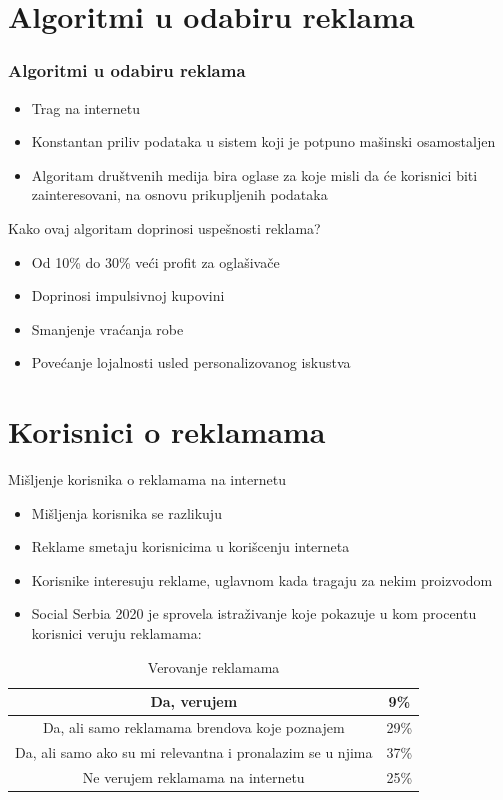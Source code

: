\documentclass{beamer}
\begin{document}
	\section{Algoritmi u odabiru reklama}
	\begin{frame}
		\frametitle{Algoritmi u odabiru reklama}
		\begin{itemize}
			\item Trag na internetu
			\item Konstantan priliv podataka u sistem koji je potpuno mašinski osamostaljen
			\item Algoritam društvenih medija bira oglase za koje misli da će korisnici biti zainteresovani, na osnovu prikupljenih podataka
		\end{itemize} 
	\end{frame}
	
	\begin{frame}{Kako ovaj algoritam doprinosi uspešnosti reklama?}
		\begin{itemize}
			\item Od 10\% do 30\% veći profit za oglašivače
			\item Doprinosi impulsivnoj kupovini
			\item Smanjenje vraćanja robe
			\item Povećanje lojalnosti usled personalizovanog iskustva
		\end{itemize}
	\end{frame}
	
	\section{Korisnici o reklamama}
	\begin{frame}{Mišljenje korisnika o reklamama na internetu}
		\begin{itemize}
			\item Mišljenja korisnika se razlikuju
			\item Reklame smetaju korisnicima u korišcenju interneta
			\item Korisnike interesuju reklame, uglavnom kada tragaju za nekim proizvodom
			\item Social Serbia 2020 je sprovela istraživanje koje pokazuje u kom procentu korisnici veruju reklamama:
		\end{itemize}
		\begin{table}[h!]
			\begin{center}
				\caption{Verovanje reklamama}
				\begin{tabular}{|c|c|} \hline
					Da, verujem&9\%\\ \hline
					Da, ali samo reklamama brendova koje poznajem&29\%\\ \hline
					Da, ali samo ako su mi relevantna i pronalazim se u njima&37\%\\ \hline
					Ne verujem reklamama na internetu&25\%\\ \hline
				\end{tabular}
				\label{tab:tabela1}
			\end{center}
		\end{table}
	\end{frame}
	
\end{document}
